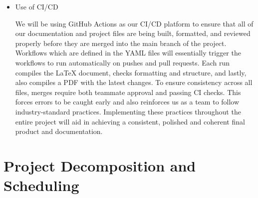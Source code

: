 \documentclass{article}
\begin{document}
\begin{itemize}
 \item Use of CI/CD


 We will be using GitHub Actions as our CI/CD platform to ensure that all of our documentation and project files are being built,
formatted, and reviewed properly before they are merged into the main branch of the project. Workflows which are defined in the
YAML files will essentially trigger the workflows to run automatically on pushes and pull requests. Each run compiles the LaTeX
document, checks formatting and structure, and lastly, also compiles a PDF with the latest changes. To ensure consistency across
all files, merges require both teammate approval and passing CI checks. This forces errors to be caught early and also reinforces
us as a team to follow industry-standard practices. Implementing these practices throughout the entire project will aid in
achieving a consistent, polished and coherent final product and documentation.


 \end{itemize}


\section{Project Decomposition and Scheduling}
\end{document}
